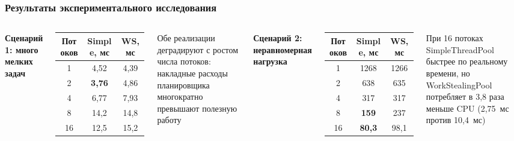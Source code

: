 \documentclass[pdf, hyperref={unicode}, aspectratio=169]{beamer}
\begin{document}
\begin{frame}
\frametitle{Результаты экспериментального исследования}

\begin{columns}[T]

\textbf{Сценарий 1: много мелких задач}

\medskip
\begin{tabular}{ccc}
\toprule
Потоков & Simple, мс & WS, мс \\
\midrule
1  & 4{,}52 & 4{,}39 \\
2  & \textbf{3{,}76} & 4{,}86 \\
4  & 6{,}77 & 7{,}93 \\
8  & 14{,}2 & 14{,}8 \\
16 & 12{,}5 & 15{,}2 \\
\bottomrule
\end{tabular}

\medskip
\small Обе реализации \alert{деградируют} с ростом
числа потоков: накладные расходы планировщика
многократно превышают полезную работу

\textbf{Сценарий 2: неравномерная нагрузка}

\medskip
\begin{tabular}{ccc}
\toprule
Потоков & Simple, мс & WS, мс \\
\midrule
1  & 1268 & 1266 \\
2  & 638  & 635  \\
4  & 317  & 317  \\
8  & \textbf{159}  & 237  \\
16 & \textbf{80{,}3} & 98{,}1 \\
\bottomrule
\end{tabular}

\medskip
\small При 16 потоках SimpleThreadPool
быстрее по реальному времени,
но WorkStealingPool потребляет
\alert{в 3{,}8 раза меньше CPU}
(2{,}75~мс против 10{,}4~мс)

\end{columns}
\end{frame}
\end{document}
